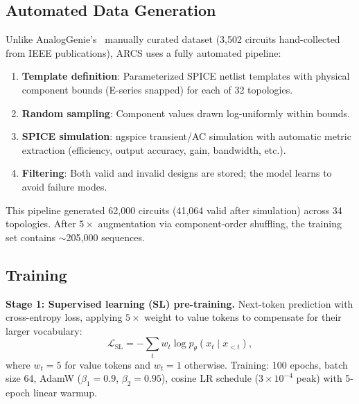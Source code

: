 \documentclass[conference]{IEEEtran}
\begin{document}
\subsection{Automated Data Generation}
\label{sec:datagen}

Unlike AnalogGenie's~\cite{analoggenie} manually curated dataset
(3,502 circuits hand-collected from IEEE publications), ARCS uses a
fully automated pipeline:
\begin{enumerate}
    \item \textbf{Template definition}: Parameterized SPICE netlist
    templates with physical component bounds (E-series snapped) for
    each of 32 topologies.
    \item \textbf{Random sampling}: Component values drawn
    log-uniformly within bounds.
    \item \textbf{SPICE simulation}: ngspice transient/AC simulation
    with automatic metric extraction (efficiency, output accuracy,
    gain, bandwidth, etc.).
    \item \textbf{Filtering}: Both valid and invalid designs are
    stored; the model learns to avoid failure modes.
\end{enumerate}

This pipeline generated 62,000 circuits (41,064 valid after simulation)
across 34 topologies. After $5\times$ augmentation via component-order
shuffling, the training set contains $\sim$205,000 sequences.

\subsection{Training}

\textbf{Stage 1: Supervised learning (SL) pre-training.}
Next-token prediction with cross-entropy loss, applying $5\times$
weight to value tokens to compensate for their larger vocabulary:
\begin{equation}
\mathcal{L}_\text{SL} = -\sum_t w_t \log p_\theta(x_t \mid x_{<t}),
\label{eq:sl_loss}
\end{equation}
where $w_t = 5$ for value tokens and $w_t = 1$ otherwise.
Training: 100 epochs, batch size 64, AdamW ($\beta_1\!=\!0.9$,
$\beta_2\!=\!0.95$), cosine LR schedule ($3 \times 10^{-4}$
peak) with 5-epoch linear warmup.
\end{document}
